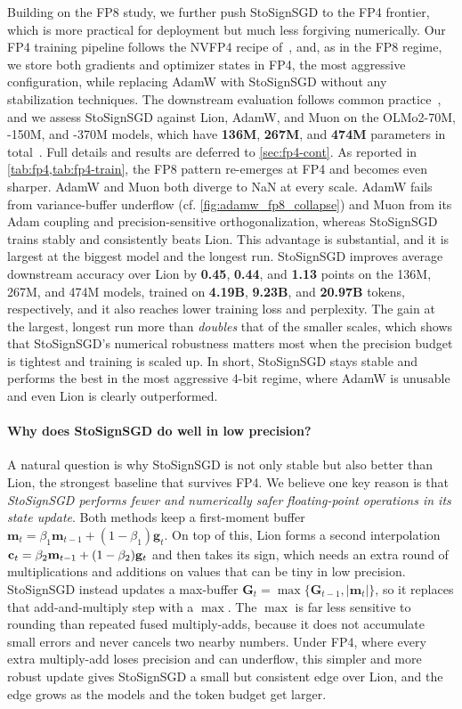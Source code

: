 \documentclass{article}
\def \g {\mathbf{g}}
\let\oldc\c
\renewcommand{\c}{\ifmmode\mathbf{c}\else\expandafter\oldc\fi}
\def \Gb {\mathbf{G}}
\def \m {\mathbf{m}}
\begin{document}
Building on the FP8 study, we further push StoSignSGD to the FP4 frontier, which is more practical for deployment but much less forgiving numerically. Our FP4 training pipeline follows the NVFP4 recipe of~\citet{chen2026tetrajetv2}, and, as in the FP8 regime, we store both gradients and optimizer states in FP4, the most aggressive configuration, while replacing AdamW with StoSignSGD without any stabilization techniques. The downstream evaluation follows common practice~\citep{pan2025unbiased,chen2026tetrajetv2}, and we assess StoSignSGD against Lion, AdamW, and Muon on the OLMo2-70M, -150M, and -370M models, which have \textbf{136M}, \textbf{267M}, and \textbf{474M} parameters in total~\citep{olmo2024olmo2}. Full details and results are deferred to \cref{sec:fp4-cont}. As reported in \cref{tab:fp4,tab:fp4-train}, the FP8 pattern re-emerges at FP4 and becomes even sharper. AdamW and Muon both diverge to NaN at every scale. AdamW fails from variance-buffer underflow (cf. \cref{fig:adamw_fp8_collapse}) and Muon from its Adam coupling and precision-sensitive orthogonalization, whereas StoSignSGD trains stably and consistently beats Lion. This advantage is substantial, and it is largest at the biggest model and the longest run. StoSignSGD improves average downstream accuracy over Lion by \textbf{0.45}, \textbf{0.44}, and \textbf{1.13} points on the 136M, 267M, and 474M models, trained on \textbf{4.19B}, \textbf{9.23B}, and \textbf{20.97B} tokens, respectively, and it also reaches lower training loss and perplexity. The gain at the largest, longest run more than \emph{doubles} that of the smaller scales, which shows that StoSignSGD's numerical robustness matters most when the precision budget is tightest and training is scaled up. In short, StoSignSGD stays stable and performs the best in the most aggressive 4-bit regime, where AdamW is unusable and even Lion is clearly outperformed.

\paragraph{Why does StoSignSGD do well in low precision?}
A natural question is why StoSignSGD is not only stable but also better than Lion, the strongest baseline that survives FP4. We believe one key reason is that \emph{StoSignSGD performs fewer and numerically safer floating-point operations in its state update}. Both methods keep a first-moment buffer $\m_t=\beta_1\m_{t-1}+(1-\beta_1)\g_t$. On top of this, Lion forms a second interpolation $\c_t=\beta_2\m_{t-1}+(1-\beta_2)\g_t$ and then takes its sign, which needs an extra round of multiplications and additions on values that can be tiny in low precision. StoSignSGD instead updates a max-buffer $\Gb_t=\max\{\Gb_{t-1},|\m_t|\}$, so it replaces that add-and-multiply step with a $\max$. The $\max$ is far less sensitive to rounding than repeated fused multiply-adds, because it does not accumulate small errors and never cancels two nearby numbers. Under FP4, where every extra multiply-add loses precision and can underflow, this simpler and more robust update gives StoSignSGD a small but consistent edge over Lion, and the edge grows as the models and the token budget get larger.
\end{document}
